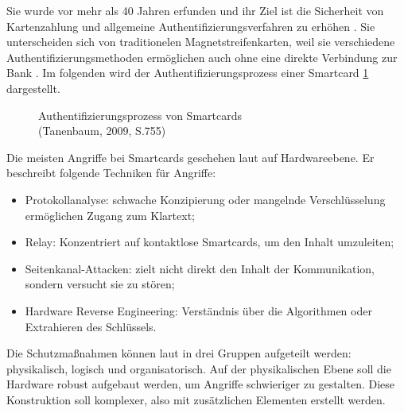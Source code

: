 Sie wurde vor mehr als 40 Jahren erfunden und ihr Ziel ist die Sicherheit von Kartenzahlung und allgemeine
Authentifizierungsverfahren zu erhöhen \cite{refip:JFSB}. Sie unterscheiden sich von traditionelen 
Magnetstreifenkarten, weil sie verschiedene Authentifizierungsmethoden ermöglichen auch ohne eine direkte 
Verbindung zur Bank \cite{refbook:ATMS}. Im folgenden wird der Authentifizierungsprozess einer Smartcard 
\ref{fig:refbook_ATMS} dargestellt. 

\vfill
\begin{figure}[H]
   \caption{Authentifizierungsprozess von Smartcards\\(Tanenbaum, 2009, S.755)}
   \label{fig:refbook_ATMS}
\end{figure}
\vfill

Die meisten Angriffe bei Smartcards geschehen laut \cite{refmas:ASSS} auf Hardwareebene.
Er beschreibt folgende Techniken für Angriffe:

\begin{itemize}
    \item Protokollanalyse: schwache Konzipierung oder mangelnde Verschlüsselung ermöglichen Zugang 
    zum Klartext; 
    \item Relay: Konzentriert auf kontaktlose Smartcards, um den Inhalt umzuleiten;
    \item Seitenkanal-Attacken: zielt nicht direkt den Inhalt der Kommunikation, sondern versucht sie
    zu stören;
    \item Hardware Reverse Engineering: Verständnis über die Algorithmen oder Extrahieren des Schlüssels.
\end{itemize}


Die Schutzmaßnahmen können laut \cite{refmas:ASSS} in drei Gruppen aufgeteilt werden: physikalisch,
logisch und organisatorisch. Auf der physikalischen Ebene soll die Hardware robust aufgebaut werden,
um Angriffe schwieriger zu gestalten. Diese Konstruktion soll komplexer, also mit zusätzlichen Elementen erstellt
werden. 

